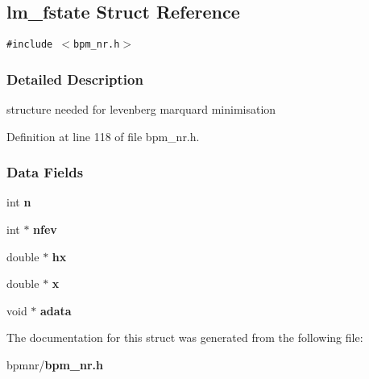 \subsection{lm\_\-fstate Struct Reference}
\label{structlm__fstate}
{\tt \#include $<$bpm\_\-nr.h$>$}



\subsubsection{Detailed Description}
structure needed for levenberg marquard minimisation 

Definition at line 118 of file bpm\_\-nr.h.\subsubsection*{Data Fields}
\begin{CompactItemize}
\item 
int \textbf{n}\label{structlm__fstate_f449b83ccdcf43aaf8cbd3ac0c9ae160}

\item 
int $\ast$ \textbf{nfev}\label{structlm__fstate_91004879d4efbec023c0b8c317487384}

\item 
double $\ast$ \textbf{hx}\label{structlm__fstate_88d7955ba2ae804c6aad61dcd996e4dc}

\item 
double $\ast$ \textbf{x}\label{structlm__fstate_4f93b5b8d96a473d92cf075cec85c935}

\item 
void $\ast$ \textbf{adata}\label{structlm__fstate_26ef87f16e5d54eca25e0675cd0051dc}

\end{CompactItemize}


The documentation for this struct was generated from the following file:\begin{CompactItemize}
\item 
bpmnr/{\bf bpm\_\-nr.h}\end{CompactItemize}
